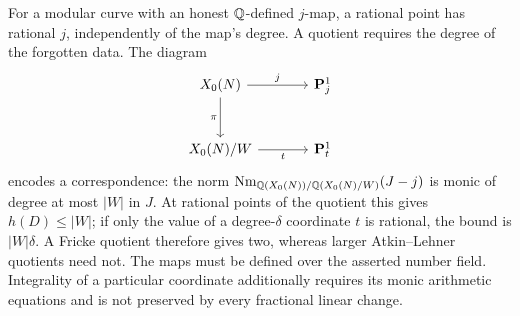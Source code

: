 For a modular curve with an honest $\mathbb Q$-defined $j$-map, a rational
point has rational $j$, independently of the map's degree. A quotient
requires the degree of the forgotten data. The diagram
\[
\begin{tikzcd}[column sep=large,row sep=large]
 X_0(N) \arrow[r,"j"] \arrow[d,"\pi"'] & \mathbf P^1_j\\
 X_0(N)/W \arrow[r,"t"'] & \mathbf P^1_t
\end{tikzcd}
\]
encodes a correspondence: the norm
$\operatorname{Nm}_{\mathbb Q(X_0(N))/\mathbb Q(X_0(N)/W)}(J-j)$ is monic of
degree at most $|W|$ in $J$. At rational points of the quotient this
gives $h(D)\le|W|$; if only the value of a degree-$\delta$ coordinate
$t$ is rational, the bound is $|W|\delta$. A Fricke quotient therefore
gives two, whereas larger Atkin--Lehner quotients need not. The maps
must be defined over the asserted number field. Integrality of a
particular coordinate additionally requires its monic arithmetic
equations and is not preserved by every fractional linear change.

